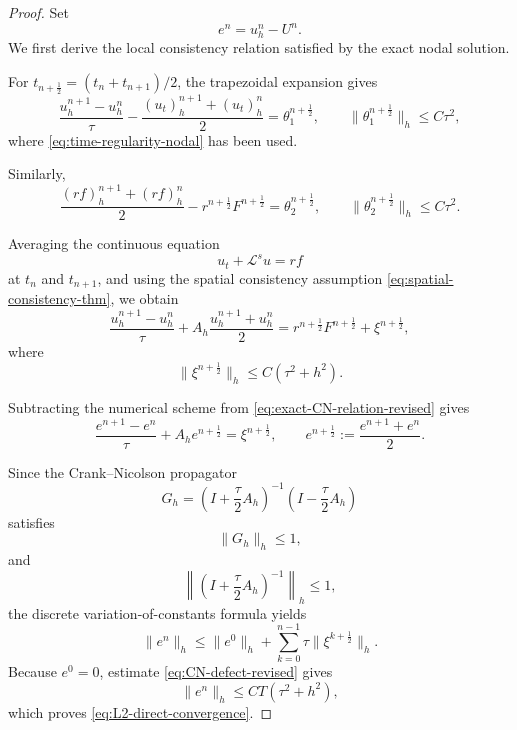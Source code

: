 \documentclass[reqno]{amsart}
\begin{document}
\begin{proof}
Set
\[
e^n=u_h^n-U^n.
\]
We first derive the local consistency relation satisfied by the exact
nodal solution.

For \(t_{n+\frac12}=(t_n+t_{n+1})/2\), the trapezoidal expansion gives
\begin{equation}
\frac{u_h^{n+1}-u_h^n}{\tau}
-
\frac{(u_t)_h^{n+1}+(u_t)_h^n}{2}
=
\theta_1^{n+\frac12},
\qquad
\|\theta_1^{n+\frac12}\|_h
\le C\tau^2,
\label{eq:time-defect-1}
\end{equation}
where \eqref{eq:time-regularity-nodal} has been used.

Similarly,
\begin{equation}
\frac{(rf)_h^{n+1}+(rf)_h^n}{2}
-
r^{n+\frac12}F^{n+\frac12}
=
\theta_2^{n+\frac12},
\qquad
\|\theta_2^{n+\frac12}\|_h
\le C\tau^2.
\label{eq:time-defect-2}
\end{equation}

Averaging the continuous equation
\[
u_t+ \mathcal L^s u=rf
\]
at \(t_n\) and \(t_{n+1}\), and using the spatial consistency
assumption \eqref{eq:spatial-consistency-thm}, we obtain
\begin{equation}
\frac{u_h^{n+1}-u_h^n}{\tau}
+
A_h\frac{u_h^{n+1}+u_h^n}{2}
=
r^{n+\frac12}F^{n+\frac12}
+
\xi^{n+\frac12},
\label{eq:exact-CN-relation-revised}
\end{equation}
where
\begin{equation}
\|\xi^{n+\frac12}\|_h
\le C(\tau^2+h^2).
\label{eq:CN-defect-revised}
\end{equation}

Subtracting the numerical scheme from
\eqref{eq:exact-CN-relation-revised} gives
\begin{equation}
\frac{e^{n+1}-e^n}{\tau}
+
A_h e^{n+\frac12}
=
\xi^{n+\frac12},
\qquad
e^{n+\frac12}:=\frac{e^{n+1}+e^n}{2}.
\label{eq:error-equation-direct}
\end{equation}

Since the Crank--Nicolson propagator
\[
G_h=
\left(I+\frac{\tau}{2}A_h\right)^{-1}
\left(I-\frac{\tau}{2}A_h\right)
\]
satisfies
\[
\|G_h\|_h\le 1,
\]
and
\[
\left\|
\left(I+\frac{\tau}{2}A_h\right)^{-1}
\right\|_h
\le 1,
\]
the discrete variation-of-constants formula yields
\[
\|e^n\|_h
\le
\|e^0\|_h
+
\sum_{k=0}^{n-1}
\tau
\|\xi^{k+\frac12}\|_h.
\]
Because \(e^0=0\), estimate \eqref{eq:CN-defect-revised} gives
\[
\|e^n\|_h
\le
CT(\tau^2+h^2),
\]
which proves \eqref{eq:L2-direct-convergence}.


\end{proof}
\end{document}
